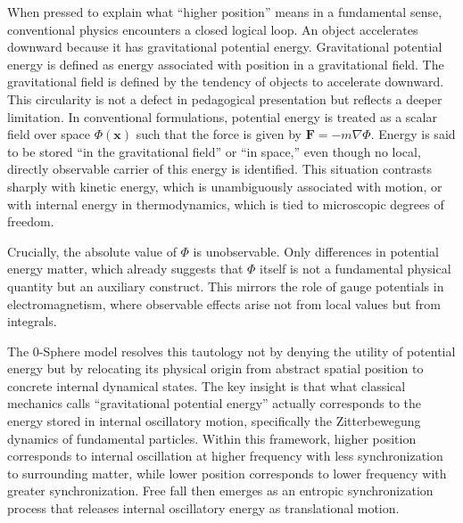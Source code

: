 \documentclass[%
 reprint,
 amsmath,amssymb,
 aps,
 prb,
]{revtex4-2}
\numberwithin{equation}{section}
\begin{document}
When pressed to explain what ``higher position'' means in a fundamental sense, conventional physics encounters a closed logical loop. An object accelerates downward because it has gravitational potential energy. Gravitational potential energy is defined as energy associated with position in a gravitational field. The gravitational field is defined by the tendency of objects to accelerate downward. This circularity is not a defect in pedagogical presentation but reflects a deeper limitation. In conventional formulations, potential energy is treated as a scalar field over space $\Phi(\mathbf{x})$ such that the force is given by $\mathbf{F} = - m \nabla \Phi$. Energy is said to be stored ``in the gravitational field'' or ``in space,'' even though no local, directly observable carrier of this energy is identified. This situation contrasts sharply with kinetic energy, which is unambiguously associated with motion, or with internal energy in thermodynamics, which is tied to microscopic degrees of freedom.

Crucially, the absolute value of $\Phi$ is unobservable. Only differences in potential energy matter, which already suggests that $\Phi$ itself is not a fundamental physical quantity but an auxiliary construct. This mirrors the role of gauge potentials in electromagnetism, where observable effects arise not from local values but from integrals.

The 0-Sphere model resolves this tautology not by denying the utility of potential energy but by relocating its physical origin from abstract spatial position to concrete internal dynamical states. The key insight is that what classical mechanics calls ``gravitational potential energy'' actually corresponds to the energy stored in internal oscillatory motion, specifically the Zitterbewegung dynamics of fundamental particles. Within this framework, higher position corresponds to internal oscillation at higher frequency with less synchronization to surrounding matter, while lower position corresponds to lower frequency with greater synchronization. Free fall then emerges as an entropic synchronization process that releases internal oscillatory energy as translational motion.
\end{document}
